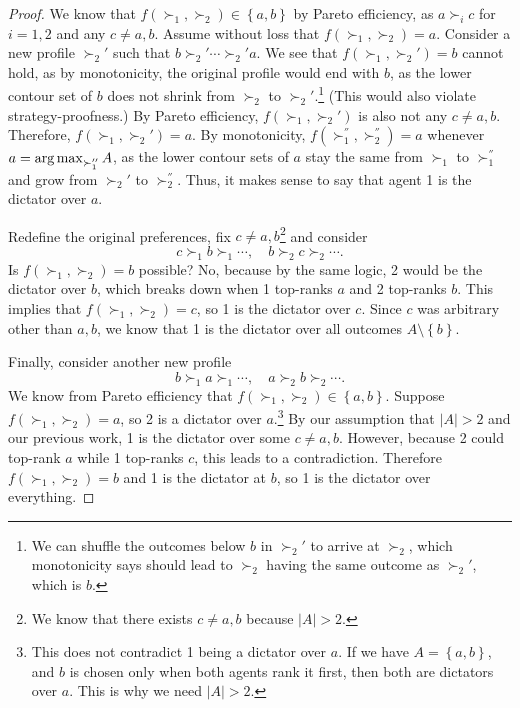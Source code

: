 \begin{proof}
	We know that $f(\succ_1, \succ_2) \in \left\{a,b\right\}$ by Pareto efficiency, as $a \succ_i c$ for $i = 1,2$ and any $c \ne a,b$.
	Assume without loss that $f(\succ_1,\succ_2) = a$. Consider a new profile $\succ_2'$ such that $b\succ_2' \cdots \succ_2' a$. We see that $f(\succ_1, \succ_2') = b$ cannot hold, as by monotonicity, the original profile would end with $b$, as the lower contour set of $b$ does not shrink from $\succ_2$ to $\succ_2'$.\footnote{We can shuffle the outcomes below $b$ in $\succ_2'$ to arrive at $\succ_2$, which monotonicity says should lead to $\succ_2$ having the same outcome as $\succ_2'$, which is $b$.} (This would also violate strategy-proofness.)
	By Pareto efficiency, $f(\succ_1, \succ_2')$ is also not any $c \ne a,b$. Therefore, $f(\succ_1,\succ_2') = a$. By monotonicity, $f\left( \succ_1^{''}, \succ_2^{''} \right) = a$ whenever $a = \operatorname*{arg\,max}_{\succ_1''} A$, as the lower contour sets of $a$ stay the same from $\succ_1$ to $\succ_1^{''}$ and grow from $\succ_2'$ to $\succ_2^{''}$.
	Thus, it makes sense to say that agent 1 is the dictator over $a$.

	Redefine the original preferences, fix $c \ne a,b$\footnote{We know that there exists $c\ne a,b$ because $\left| A \right| > 2$.} and consider \[
		c \succ_1 b \succ_1 \cdots, \quad b \succ_2 c \succ_2 \cdots
	.\] Is $f(\succ_1, \succ_2) = b$ possible? No, because by the same logic, 2 would be the dictator over $b$, which breaks down when 1 top-ranks $a$ and 2 top-ranks $b$. This implies that $f(\succ_1,\succ_2) = c$, so 1 is the dictator over $c$. Since $c$ was arbitrary other than $a,b$, we know that 1 is the dictator over all outcomes $A \setminus \left\{b\right\}$.

	Finally, consider another new profile \[
		b \succ_1 a \succ_1 \cdots,\quad a \succ_2 b \succ_2 \cdots
	.\]
	We know from Pareto efficiency that $f(\succ_1,\succ_2) \in \left\{a,b\right\}$. Suppose $f(\succ_1,\succ_2) = a$, so 2 is a dictator over $a$.\footnote{This does not contradict 1 being a dictator over $a$. If we have $A = \left\{a,b\right\}$, and $b$ is chosen only when both agents rank it first, then both are dictators over $a$. This is why we need $\left| A \right| > 2$.} By our assumption that $\left| A \right| > 2$ and our previous work, 1 is the dictator over some $c \ne a,b$. However, because 2 could top-rank $a$ while 1 top-ranks $c$, this leads to a contradiction.
	Therefore $f(\succ_1,\succ_2) = b$ and 1 is the dictator at $b$, so 1 is the dictator over everything.


\end{proof}
